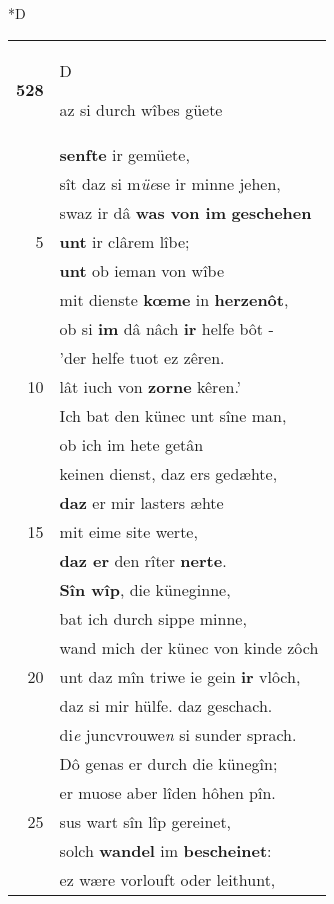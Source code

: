 \documentclass[8pt,a4paper,notitlepage]{article}
\begin{document}
\begin{table}[ht]
\begin{minipage}[t]{0.5\linewidth}
\small
\begin{center}*D
\end{center}
\begin{tabular}{rl}
\textbf{528} & \begin{large}D\end{large}az si durch wîbes güete\\ 
 & \textbf{senfte} ir gemüete,\\ 
 & sît daz si m\textit{üe}se ir minne jehen,\\ 
 & swaz ir dâ \textbf{was von im} \textbf{geschehen}\\ 
5 & \textbf{unt} ir clârem lîbe;\\ 
 & \textbf{unt} ob ieman von wîbe\\ 
 & mit dienste \textbf{kœme} in \textbf{herzenôt},\\ 
 & ob si \textbf{im} dâ nâch \textbf{ir} helfe bôt -\\ 
 & 'der helfe tuot ez zêren.\\ 
10 & lât iuch von \textbf{zorne} kêren.'\\ 
 & Ich bat den künec unt sîne man,\\ 
 & ob ich im hete getân\\ 
 & keinen dienst, daz ers gedæhte,\\ 
 & \textbf{daz} er mir lasters æhte\\ 
15 & mit eime site werte,\\ 
 & \textbf{daz er} den rîter \textbf{nerte}.\\ 
 & \textbf{Sîn wîp}, die küneginne,\\ 
 & bat ich durch sippe minne,\\ 
 & wand mich der künec von kinde zôch\\ 
20 & unt daz mîn triwe ie gein \textbf{ir} vlôch,\\ 
 & daz si mir hülfe. daz geschach.\\ 
 & di\textit{e} juncvrouwe\textit{n} si sunder sprach.\\ 
 & Dô genas er durch die künegîn;\\ 
 & er muose aber lîden hôhen pîn.\\ 
25 & sus wart sîn lîp gereinet,\\ 
 & solch \textbf{wandel} im \textbf{bescheinet}:\\ 
 & ez wære vorlouft oder leithunt,\\ 

\end{tabular}
\end{minipage}
\end{table}
\end{document}
